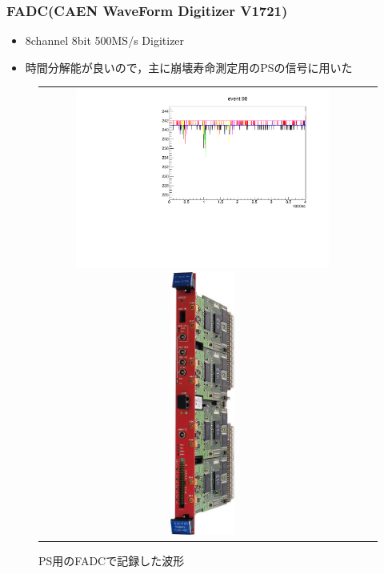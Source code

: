 \subsubsection{FADC(CAEN WaveForm Digitizer V1721)}
  \begin{itemize}
    \item 8channel 8bit 500MS/s Digitizer
    \item 時間分解能が良いので，主に崩壊寿命測定用のPSの信号に用いた
  \end{itemize}
  \begin{figure}[H]
    \begin{tabular}{cc}
      \begin{minipage}{0.5\hsize}
        \centering
        \includegraphics[width=0.8\textwidth,angle=-90]{figure/hayakawa/ps_plot.pdf}
        \caption{PS用のFADCで記録した波形}
      \end{minipage}
      \begin{minipage}{0.4\hsize}
        \centering
        \includegraphics[width=0.2\textwidth]{figure/hayakawa/1095_L.jpg}
      \end{minipage}
    \end{tabular}
  \end{figure}




